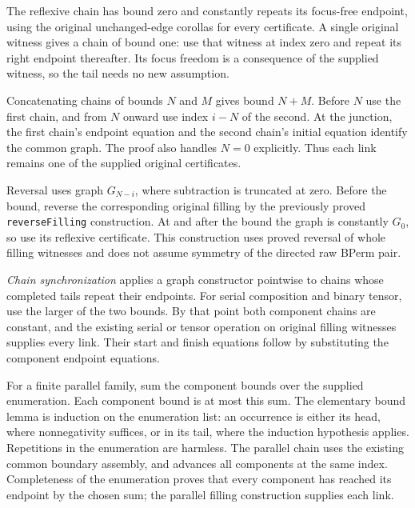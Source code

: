 
The reflexive chain has bound zero and constantly repeats its focus-free
endpoint, using the original unchanged-edge corollas for every certificate.
A single original witness gives a chain of bound one: use that witness at
index zero and repeat its right endpoint thereafter. Its focus freedom is a
consequence of the supplied witness, so the tail needs no new assumption.


Concatenating chains of bounds $N$ and $M$ gives bound $N+M$. Before $N$ use
the first chain, and from $N$ onward use index $i-N$ of the second. At the
junction, the first chain's endpoint equation and the second chain's initial
equation identify the common graph. The proof also handles $N=0$ explicitly.
Thus each link remains one of the supplied original certificates.


Reversal uses graph $G_{N-i}$, where subtraction is truncated at zero.
Before the bound, reverse the corresponding original filling by the previously
proved \texttt{reverseFilling} construction. At and after the bound the graph
is constantly $G_0$, so use its reflexive certificate. This construction uses
proved reversal of whole filling witnesses and does not assume symmetry of
the directed raw BPerm pair.


\emph{Chain synchronization} applies a graph constructor pointwise to chains
whose completed tails repeat their endpoints. For serial composition and
binary tensor, use the larger of the two bounds. By that point both component
chains are constant, and the existing serial or tensor operation on original
filling witnesses supplies every link. Their start and finish equations follow
by substituting the component endpoint equations.


For a finite parallel family, sum the component bounds over the supplied
enumeration. Each component bound is at most this sum. The elementary bound
lemma is induction on the enumeration list: an occurrence is either its head,
where nonnegativity suffices, or in its tail, where the induction hypothesis
applies. Repetitions in the enumeration are harmless. The parallel chain uses
the existing common boundary assembly, and advances all components at the
same index. Completeness of the enumeration proves that every component has
reached its endpoint by the chosen sum; the parallel filling construction
supplies each link.

